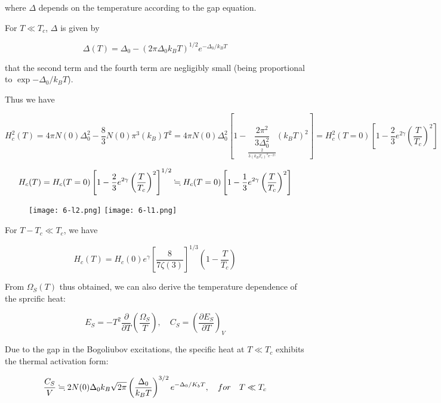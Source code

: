 where $\Delta$ depends on the temperature according to the gap equation. 

For $T\ll T_c$, $\Delta$ is given by 

\[\Delta(T) =\Delta_0-(2\pi\Delta_0 k_BT)^{1/2}e^{-\Delta_0/k_BT} \]

that the second term and the fourth term are negligibly small (being proportional to $\exp{-\Delta_0/k_BT}$). 

Thus we have

\[H_c^2(T) = 4\pi N(0)\Delta_0^2-\frac{8}{3}N(0)\pi^3 (k_B)T^2  = 4\pi N(0)\Delta_0^2\left[1 - \underset{\frac{2}{3(k_BT_c)^2 e^{-2\gamma}}}{\frac{2\pi^2}{3\Delta_0^2}}(k_BT)^2\right] = H_c^2(T=0)\left[ 1 - \frac{2}{3} e^{2\gamma}\left(\frac{T}{T_c}\right)^2\right]\]

\[H_c(T) = H_c(T=0)\left[ 1 - \frac{2}{3} e^{2\gamma}\left(\frac{T}{T_c}\right)^2\right]^{1/2} \fallingdotseq H_c(T=0)\left[ 1 - \frac{1}{3} e^{2\gamma}\left(\frac{T}{T_c}\right)^2\right] \]

\begin{wrapfigure}{l}{6cm}
\texttt{[image: 6-l2.png]}
\texttt{[image: 6-l1.png]}
\end{wrapfigure}



For $T-T_c\ll T_c$, we have

\[H_c(T)=H_c(0)e^\gamma \left[\frac{8}{7\zeta(3)}\right]^{1/3}\left(1-\frac{T}{T_c}\right) \]

From $\Omega_S(T)$ thus obtained, we can also derive the temperature dependence of the sprcific heat:

\[E_S=-T^2\frac{\partial}{\partial T}\left(\frac{\Omega_S}{T}\right),\quad C_S=\left(\frac{\partial E_S}{\partial T}\right)_V \]

Due to the gap in the Bogoliubov excitations, the specific heat at $T\ll T_c$ exhibits the thermal activation form:

\[\frac{C_S}{V}\fallingdotseq 2N(0)\Delta_0 k_B\sqrt{2\pi}\left(\frac{\Delta_0}{k_B T}\right)^{3/2}e^{-\Delta_0/K_bT},\quad for\quad T\ll T_c \]


